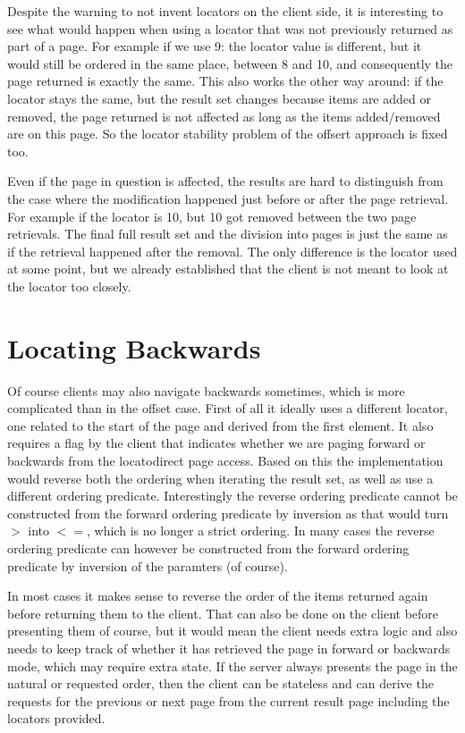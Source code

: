 \documentclass[11pt,a4paper]{article}
\begin{document}
\begin{multicols*}{2}
Despite the warning to not invent locators on the client side, it is interesting 
to see what would happen when using a locator that was not previously returned as part of a page. For example 
if we use 9: the locator value is different, but it would still be ordered in the same
place, between 8 and 10, and consequently the page returned is exactly the same.
This also works the other way around: if the locator stays the same, but the
result set changes because items are added or removed, the page returned is not
affected as long as the items added/removed are on this page. So the locator
stability problem of the offsert approach is fixed too.

Even if the page in question is affected, the results are hard to distinguish
from the case where the modification happened just before or after the page
retrieval. For example if the locator is 10, but 10 got removed between the two
page retrievals. The final full result set and the division into pages is just
the same as if the retrieval happened after the removal. The only difference is
the locator used at some point, but we already established that the client is
not meant to look at the locator too closely.

\section*{Locating Backwards}

Of course clients may also navigate backwards sometimes, which is more
complicated than in the offset case. First of all it ideally uses a different
locator, one related to the start of the page and derived from the first
element. It also requires a flag by the client that indicates whether we are
paging forward or backwards from the locatodirect page access. Based on this the
implementation would reverse both the ordering when iterating the result set, as
well as use a different ordering predicate. Interestingly the reverse ordering
predicate cannot be constructed from the forward ordering predicate by inversion
as that would turn $>$ into $<=$, which is no longer a strict ordering. In many
cases the reverse ordering predicate can however be constructed from the forward
ordering predicate by inversion of the paramters (of course).

In most cases it makes sense to reverse the
order of the items returned again before returning them to the client. That
can also be done on the client before presenting them of course, but it would
mean the client needs extra logic and also needs to keep track of whether it has
retrieved the page in forward or backwards mode, which may require extra state.
If the server always presents the page in the natural or requested order, then
the client can be stateless and can derive the requests for the previous or next
page from the current result page including the locators provided.


\end{multicols*}
\end{document}
